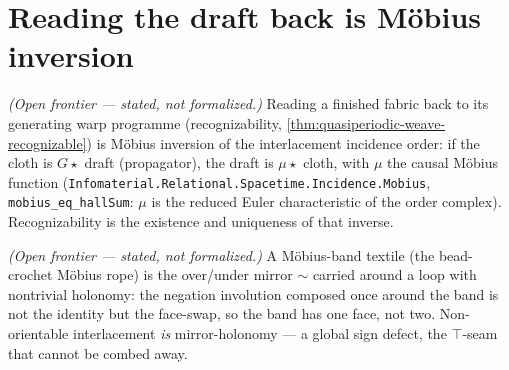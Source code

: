 \section{Reading the draft back is M\"obius inversion}

\begin{theorem}\label{thm:recognizability-is-mobius}\notready{}
\emph{(Open frontier --- stated, not formalized.)} Reading a finished fabric back to its
generating warp programme (recognizability, \cref{thm:quasiperiodic-weave-recognizable}) is
M\"obius inversion of the interlacement incidence order: if the cloth is $G\star$ draft
(propagator), the draft is $\mu\star$ cloth, with $\mu$ the causal M\"obius function
(\texttt{Infomaterial.Relational.Spacetime.Incidence.Mobius}, \texttt{mobius\_eq\_hallSum}: $\mu$ is the
reduced Euler characteristic of the order complex). Recognizability is the existence and
uniqueness of that inverse.
\end{theorem}

\begin{theorem}\label{thm:mobius-band-holonomy}\notready{}
\emph{(Open frontier --- stated, not formalized.)} A M\"obius-band textile (the
bead-crochet M\"obius rope) is the over/under mirror $\sim$ carried around a loop with
nontrivial holonomy: the negation involution composed once around the band is not the
identity but the face-swap, so the band has one face, not two. Non-orientable
interlacement \emph{is} mirror-holonomy --- a global sign defect, the $\top$-seam that
cannot be combed away.
\end{theorem}
